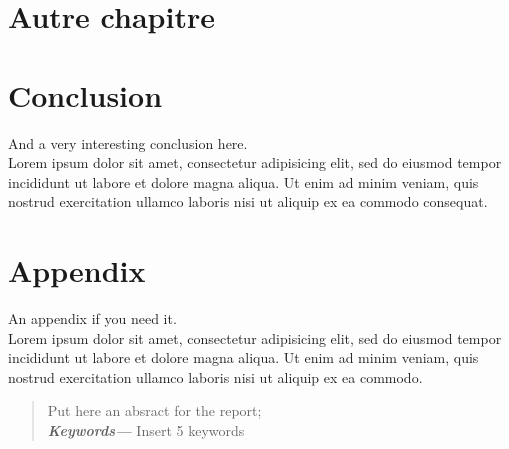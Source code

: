 \documentclass[a4paper, oneside]{report}
\providecommand{\keywords}[1]{\textbf{\textit{Keywords---}} #1}
\begin{document}
\chapter*{Autre chapitre}
\label{chapter2}
%
%

\chapter*{Conclusion}
\label{chap:conclusion}
%
  And a very interesting conclusion here\@. ~\\
  Lorem ipsum dolor sit amet, consectetur adipisicing elit, sed do eiusmod
  tempor incididunt ut labore et dolore magna aliqua. Ut enim ad minim veniam,
  quis nostrud exercitation ullamco laboris nisi ut aliquip ex ea commodo
  consequat.

\chapter*{Appendix}
\label{chap:appendix}

  An appendix if you need it. ~\\

  Lorem ipsum dolor sit amet, consectetur adipisicing elit, sed do eiusmod
  tempor incididunt ut labore et dolore magna aliqua. Ut enim ad minim veniam,
  quis nostrud exercitation ullamco laboris nisi ut aliquip ex ea commodo.





\begin{abstract}

Put here an absract for the report; \\

\keywords{Insert 5 keywords}
\end{abstract}
\end{document}
